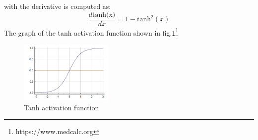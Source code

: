 \begin{itemize}
\begin{equation}
    \end{equation}
    with the derivative is computed as:
    \begin{equation}
        \frac{d\text{tanh(x)}}{dx} = 1-\text{tanh}^2(x)
    \end{equation}
    The graph of the tanh activation function shown in fig.\ref{fig:tanh}\footnote{https://www.medcalc.org}
    \begin{figure}[h!]
        \centering
        \includegraphics[width=0.4\textwidth]{Chapters/Fig/tanh.png}
        \caption{Tanh activation function}
        \label{fig:tanh}
    \end{figure}


\end{itemize}
